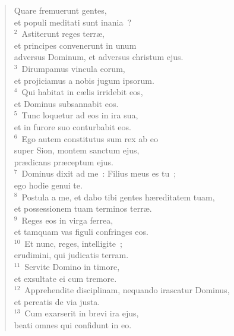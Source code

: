 \begin{flushleft}\begin{verse}\vspace{-19pt}Quare fremuerunt gentes,\\ et populi meditati sunt inania~?\\
${}^{2}$~Astiterunt reges terr\ae ,\\ et principes convenerunt in unum\\ adversus Dominum, et adversus christum ejus.\\
${}^{3}$~Dirumpamus vincula eorum,\\ et projiciamus a nobis jugum ipsorum.\\
${}^{4}$~Qui habitat in c\ae lis irridebit eos,\\ et Dominus subsannabit eos.\\
${}^{5}$~Tunc loquetur ad eos in ira sua,\\ et in furore suo conturbabit eos.\\
${}^{6}$~Ego autem constitutus sum rex ab eo\\ super Sion, montem sanctum ejus,\\ pr\ae dicans pr\ae ceptum ejus.\\
${}^{7}$~Dominus dixit ad me~: Filius meus es tu~;\\ ego hodie genui te.\\
${}^{8}$~Postula a me, et dabo tibi gentes h\ae reditatem tuam,\\ et possessionem tuam terminos terr\ae .\\
${}^{9}$~Reges eos in virga ferrea,\\ et tamquam vas figuli confringes eos.\\
${}^{10}$~Et nunc, reges, intelligite~;\\ erudimini, qui judicatis terram.\\
${}^{11}$~Servite Domino in timore,\\ et exsultate ei cum tremore.\\
${}^{12}$~Apprehendite disciplinam, nequando irascatur Dominus,\\ et pereatis de via justa.\\
${}^{13}$~Cum exarserit in brevi ira ejus,\\ beati omnes qui confidunt in eo.\end{verse}\end{flushleft}



